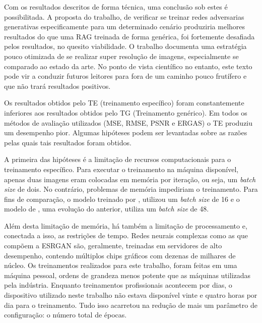 Com os resultados descritos de forma técnica, uma conclusão sob estes é possibilitada. A proposta do trabalho, de verificar se treinar redes adversarias generativas especificamente para um determinado cenário produziria melhores resultados do que uma RAG treinada de forma genérica, foi fortemente desafiada pelos resultados, no quesito viabilidade. O trabalho documenta uma estratégia pouco otimizada de se realizar super resolução de imagens, especialmente se comparado ao estado da arte. No ponto de vista científico no entanto, este texto pode vir a conduzir futuros leitores para fora de um caminho pouco frutífero e que não trará resultados positivos. 

Os resultados obtidos pelo TE (treinamento específico) foram constantemente inferiores aos resultados obtidos pelo TG (Treinamento genérico). Em todos os métodos de avaliação utilizados (MSE, RMSE, PSNR e ERGAS) o TE produziu um desempenho pior. Algumas hipóteses podem ser levantadas sobre as razões pelas quais tais resultados foram obtidos.

A primeira das hipóteses é a limitação de recursos computacionais para o treinamento específico. Para executar o treinamento na máquina disponível, apenas duas imagens eram colocadas em memória por iteração, ou seja, um \textit{batch size} de dois. No contrário, problemas de memória impediriam o treinamento. Para fins de comparação, o modelo treinado por , utilizou um \textit{batch size} de 16 e o modelo de , uma evolução do anterior, utiliza um \textit{batch size} de 48. 

Além desta limitação de memória, há também a limitação de processamento e, conectada a isso, as restrições de tempo. Redes neurais complexas como as que compõem a ESRGAN são, geralmente, treinadas em servidores de alto desempenho, contendo múltiplos chips gráficos com dezenas de milhares de núcleo. Os treinamentos realizados para este trabalho, foram feitas em uma máquina pessoal, ordens de grandeza menos potente que as máquinas utilizadas pela indústria. Enquanto treinamentos profissionais acontecem por dias, o dispositivo utilizado neste trabalho não estava disponível vinte e quatro horas por dia para o treinamento. Tudo isso acarretou na redução de mais um parâmetro de configuração: o número total de épocas.

